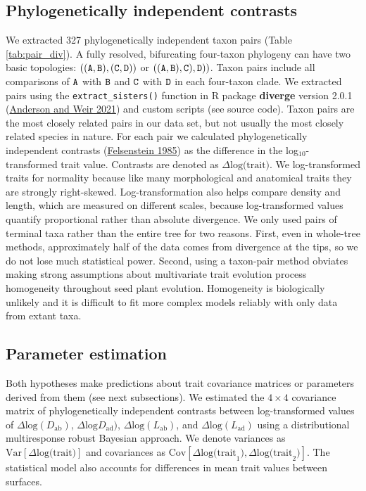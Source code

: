 \documentclass[
  10pt,
]{article}
\begin{document}
\hypertarget{phylogenetically-independent-contrasts}{%
\subsection{Phylogenetically independent contrasts}\label{phylogenetically-independent-contrasts}}

We extracted 327 phylogenetically independent taxon pairs (Table \ref{tab:pair_div}). A fully resolved, bifurcating four-taxon phylogeny can have two basic topologies: \(\tt{((A,B),(C,D))}\) or \(\tt{((A,B),C),D))}\). Taxon pairs include all comparisons of \(\tt{A}\) with \(\tt{B}\) and \(\tt{C}\) with \(\tt{D}\) in each four-taxon clade. We extracted pairs using the \texttt{extract\_sisters()} function in R package \textbf{diverge} version 2.0.1 (\protect\hyperlink{ref-anderson_diverge_2021}{Anderson and Weir 2021}) and custom scripts (see source code). Taxon pairs are the most closely related pairs in our data set, but not usually the most closely related species in nature. For each pair we calculated phylogenetically independent contrasts (\protect\hyperlink{ref-felsenstein_phylogenies_1985}{Felsenstein 1985}) as the difference in the log\(_{10}\)-transformed trait value. Contrasts are denoted as \(\Delta \text{log(trait)}\). We log-transformed traits for normality because like many morphological and anatomical traits they are strongly right-skewed. Log-transformation also helps compare density and length, which are measured on different scales, because log-transformed values quantify proportional rather than absolute divergence. We only used pairs of terminal taxa rather than the entire tree for two reasons. First, even in whole-tree methods, approximately half of the data comes from divergence at the tips, so we do not lose much statistical power. Second, using a taxon-pair method obviates making strong assumptions about multivariate trait evolution process homogeneity throughout seed plant evolution. Homogeneity is biologically unlikely and it is difficult to fit more complex models reliably with only data from extant taxa.

\hypertarget{parameter-estimation}{%
\subsection{Parameter estimation}\label{parameter-estimation}}

Both hypotheses make predictions about trait covariance matrices or parameters derived from them (see next subsections). We estimated the \(4 \times 4\) covariance matrix of phylogenetically independent contrasts between log-transformed values of \(\Delta \text{log}(D_\mathrm{ab})\), \(\Delta \text{log}D_\mathrm{ad})\), \(\Delta \text{log}(L_\mathrm{ab})\), and \(\Delta \text{log}(L_\mathrm{ad})\) using a distributional multiresponse robust Bayesian approach. We denote variances as \(\text{Var}[\Delta \text{log(trait)}]\) and covariances as \(\text{Cov}[\Delta \text{log(trait}_1),\Delta \text{log(trait}_2)]\). The statistical model also accounts for differences in mean trait values between surfaces.
\end{document}
